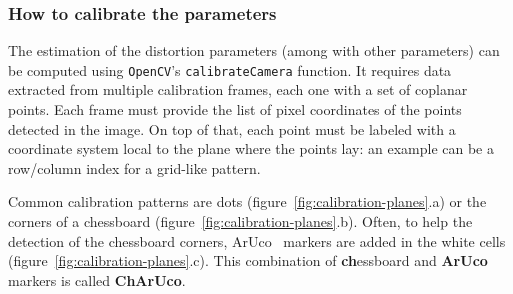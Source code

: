 \subsubsection{How to calibrate the parameters}

The estimation of the distortion parameters (among with other parameters) can be computed using \texttt{OpenCV}'s \texttt{calibrateCamera} function.
It requires data extracted from multiple calibration frames, each one with a set of coplanar points.
Each frame must provide the list of pixel coordinates of the points detected in the image.
On top of that, each point must be labeled with a coordinate system local to the plane where the points lay: an example can be a row/column index for a grid-like pattern.

Common calibration patterns are dots (figure~\ref{fig:calibration-planes}.a) or the corners of a chessboard (figure~\ref{fig:calibration-planes}.b).
Often, to help the detection of the chessboard corners, ArUco~\cite{aruco} markers are added in the white cells (figure~\ref{fig:calibration-planes}.c).
This combination of \textbf{ch}essboard and \textbf{ArUco} markers is called \textbf{ChArUco}.

